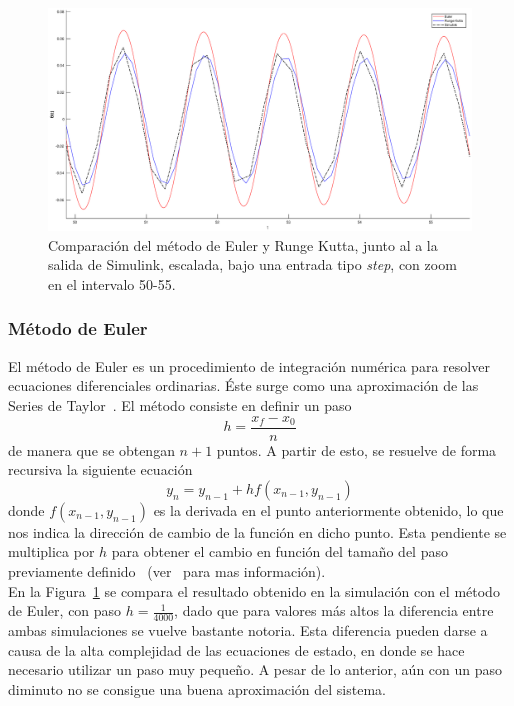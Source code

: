\documentclass[journal]{IEEEtran}
\begin{document}
\begin{figure}[!h]
\caption{Comparación del método de Euler y Runge Kutta, junto al a la salida de Simulink, escalada, bajo una entrada tipo \textit{step}, con zoom en el intervalo 50-55.\label{fig:nmth}}
  \centering
\includegraphics[scale=0.2]{nm.eps}
\end{figure}

\subsubsection*{Método de Euler}
El método de Euler es un procedimiento de integración numérica para resolver ecuaciones diferenciales ordinarias. Éste surge como una aproximación de las Series de Taylor~\cite{eu-1993}. El método consiste en definir un paso \[ h = \frac{x_f - x_0}{n} \] de manera que se obtengan $n + 1$ puntos. A partir de esto, se resuelve de forma recursiva la siguiente ecuación \[ y_n = y_{n - 1} + h f(x_{n - 1}, y_{n - 1}) \] donde $f(x_{n - 1}, y_{n - 1})$ es la derivada en el punto anteriormente obtenido, lo que nos indica la dirección de cambio de la función en dicho punto. Esta pendiente se multiplica por $h$ para obtener el cambio en función del tamaño del paso previamente definido~\cite{eu-1993} (ver~\cite{hamm} para mas información).\\

En la Figura~\ref{fig:nmth} se compara el resultado obtenido en la simulación con el método de Euler, con paso $h = \frac{1}{4000}$, dado que para valores más altos la diferencia entre ambas simulaciones se vuelve bastante notoria. Esta diferencia pueden darse a causa de la alta complejidad de las
ecuaciones de estado, en donde se hace necesario utilizar un
paso muy pequeño. A pesar de lo anterior, aún con un paso diminuto no se consigue una buena aproximación del sistema.\\
\end{document}
